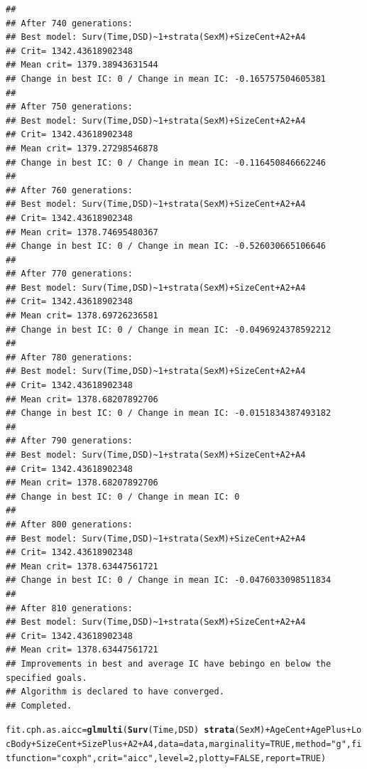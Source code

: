 \documentclass{article}\usepackage[]{graphicx}\usepackage[]{color}
\makeatletter
\newcommand{\hlnum}[1]{\textcolor[rgb]{0.686,0.059,0.569}{#1}}%
\newcommand{\hlstr}[1]{\textcolor[rgb]{0.192,0.494,0.8}{#1}}%
\newcommand{\hlopt}[1]{\textcolor[rgb]{0,0,0}{#1}}%
\newcommand{\hlstd}[1]{\textcolor[rgb]{0.345,0.345,0.345}{#1}}%
\newcommand{\hlkwb}[1]{\textcolor[rgb]{0.69,0.353,0.396}{#1}}%
\newcommand{\hlkwc}[1]{\textcolor[rgb]{0.333,0.667,0.333}{#1}}%
\newcommand{\hlkwd}[1]{\textcolor[rgb]{0.737,0.353,0.396}{\textbf{#1}}}%
\newenvironment{kframe}{%
 \def\at@end@of@kframe{}%
 \ifinner\ifhmode%
  \def\at@end@of@kframe{\end{minipage}}%
  \begin{minipage}{\columnwidth}%
 \fi\fi%
 \def\FrameCommand##1{\hskip\@totalleftmargin \hskip-\fboxsep
 \colorbox{shadecolor}{##1}\hskip-\fboxsep
     \hskip-\linewidth \hskip-\@totalleftmargin \hskip\columnwidth}%
 \MakeFramed {\advance\hsize-\width
   \@totalleftmargin\z@ \linewidth\hsize
   \@setminipage}}%
 {\par\unskip\endMakeFramed%
 \at@end@of@kframe}
\newenvironment{knitrout}{}{} %
\makeatother
\begin{document}
\begin{knitrout}
\begin{kframe}
{\ttfamily\noindent\color{warningcolor}{\#\# Warning in fitter(X, Y, strats, offset, init, control, weights = weights, : Loglik converged before variable\ \ 8 ; beta may be infinite.}}\begin{verbatim}
## 
## After 740 generations:
## Best model: Surv(Time,DSD)~1+strata(SexM)+SizeCent+A2+A4
## Crit= 1342.43618902348
## Mean crit= 1379.38943631544
## Change in best IC: 0 / Change in mean IC: -0.165757504605381
## 
## After 750 generations:
## Best model: Surv(Time,DSD)~1+strata(SexM)+SizeCent+A2+A4
## Crit= 1342.43618902348
## Mean crit= 1379.27298546878
## Change in best IC: 0 / Change in mean IC: -0.116450846662246
## 
## After 760 generations:
## Best model: Surv(Time,DSD)~1+strata(SexM)+SizeCent+A2+A4
## Crit= 1342.43618902348
## Mean crit= 1378.74695480367
## Change in best IC: 0 / Change in mean IC: -0.526030665106646
## 
## After 770 generations:
## Best model: Surv(Time,DSD)~1+strata(SexM)+SizeCent+A2+A4
## Crit= 1342.43618902348
## Mean crit= 1378.69726236581
## Change in best IC: 0 / Change in mean IC: -0.0496924378592212
## 
## After 780 generations:
## Best model: Surv(Time,DSD)~1+strata(SexM)+SizeCent+A2+A4
## Crit= 1342.43618902348
## Mean crit= 1378.68207892706
## Change in best IC: 0 / Change in mean IC: -0.0151834387493182
## 
## After 790 generations:
## Best model: Surv(Time,DSD)~1+strata(SexM)+SizeCent+A2+A4
## Crit= 1342.43618902348
## Mean crit= 1378.68207892706
## Change in best IC: 0 / Change in mean IC: 0
## 
## After 800 generations:
## Best model: Surv(Time,DSD)~1+strata(SexM)+SizeCent+A2+A4
## Crit= 1342.43618902348
## Mean crit= 1378.63447561721
## Change in best IC: 0 / Change in mean IC: -0.0476033098511834
## 
## After 810 generations:
## Best model: Surv(Time,DSD)~1+strata(SexM)+SizeCent+A2+A4
## Crit= 1342.43618902348
## Mean crit= 1378.63447561721
## Improvements in best and average IC have bebingo en below the specified goals.
## Algorithm is declared to have converged.
## Completed.
\end{verbatim}
\begin{alltt}
\hlstd{fit.cph.as.aicc} \hlkwb{=} \hlkwd{glmulti}\hlstd{(}\hlkwd{Surv}\hlstd{(Time, DSD)} \hlopt{~} \hlkwd{strata}\hlstd{(SexM)} \hlopt{+} \hlstd{AgeCent} \hlopt{+} \hlstd{AgePlus} \hlopt{+} \hlstd{LocBody} \hlopt{+} \hlstd{SizeCent} \hlopt{+} \hlstd{SizePlus} \hlopt{+} \hlstd{A2} \hlopt{+} \hlstd{A4,} \hlkwc{data} \hlstd{= data,} \hlkwc{marginality} \hlstd{=} \hlnum{TRUE}\hlstd{,} \hlkwc{method} \hlstd{=} \hlstr{"g"}\hlstd{,} \hlkwc{fitfunction} \hlstd{=} \hlstr{"coxph"}\hlstd{,} \hlkwc{crit} \hlstd{=} \hlstr{"aicc"}\hlstd{,} \hlkwc{level} \hlstd{=} \hlnum{2}\hlstd{,} \hlkwc{plotty} \hlstd{=} \hlnum{FALSE}\hlstd{,} \hlkwc{report} \hlstd{=} \hlnum{TRUE}\hlstd{)}

\end{alltt}
\end{kframe}
\end{knitrout}
\end{document}

